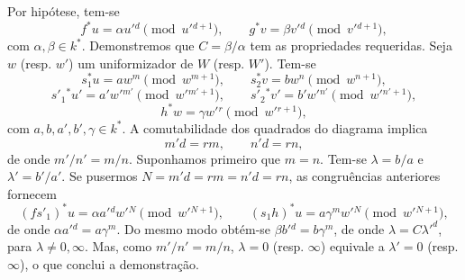 Por hipótese, tem-se
\[
f^*u=\alpha u'{}^d\pmod {u'{}^{d+1}},\qquad
g^*v=\beta v'{}^d\pmod {v'{}^{d+1}},
\]
com $\alpha,\beta\in k^*$. Demonstremos que $C=\beta/\alpha$ tem as propriedades requeridas. Seja $w$ (resp. $w'$) um uniformizador de $W$ (resp. $W'$). Tem-se
\[
s_1^*u=aw^m\pmod {w^{m+1}},\qquad
s_2^*v=bw^n\pmod {w^{n+1}},
\]
\[
s'_1{}^*u'=a'w'{}^{m'}\pmod {w'{}^{m'+1}},\qquad
s'_2{}^*v'=b'w'{}^{n'}\pmod {w'{}^{n'+1}},
\]
\[
h^*w=\gamma w'{}^r\pmod {w'{}^{r+1}},
\]
com $a,b,a',b',\gamma\in k^*$. A comutabilidade dos quadrados do diagrama implica
\[
m'd=rm,\qquad n'd=rn,
\]
de onde $m'/n'=m/n$. Suponhamos primeiro que $m=n$. Tem-se $\lambda=b/a$ e $\lambda'=b'/a'$. Se pusermos $N=m'd=rm=n'd=rn$, as congruências anteriores fornecem
\[
(fs'_1)^*u=\alpha a'{}^d w'{}^N\pmod {w'{}^{N+1}},\qquad
(s_1h)^*u=a\gamma^m w'{}^N\pmod {w'{}^{N+1}},
\]
de onde $\alpha a'{}^d=a\gamma^m$. Do mesmo modo obtém-se $\beta b'{}^d=b\gamma^m$, de onde $\lambda=C{\lambda'}^d$, para $\lambda\ne 0,\infty$. Mas, como $m'/n'=m/n$, $\lambda=0$ (resp. $\infty$) equivale a $\lambda'=0$ (resp. $\infty$), o que conclui a demonstração.
